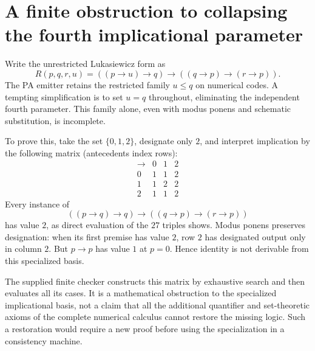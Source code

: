 \section{A finite obstruction to collapsing the fourth implicational parameter}

Write the unrestricted Lukasiewicz form as
\[
 R(p,q,r,u)=((p\to u)\to q)\to((q\to p)\to(r\to p)).
\]
The PA emitter retains the restricted family $u\le q$ on numerical codes.
A tempting simplification is to set $u=q$ throughout, eliminating the
independent fourth parameter. This family alone, even with modus ponens
and schematic substitution, is incomplete.

To prove this, take the set $\{0,1,2\}$, designate only $2$, and interpret
implication by the following matrix (antecedents index rows):
\[
\begin{array}{c|ccc}
\to&0&1&2\\\hline
0&1&1&2\\
1&1&2&2\\
2&1&1&2
\end{array}
\]
Every instance of
\[
 ((p\to q)\to q)\to((q\to p)\to(r\to p))
\]
has value $2$, as direct evaluation of the $27$ triples shows.
Modus ponens preserves designation: when its first premise has value $2$,
row $2$ has designated output only in column $2$. But $p\to p$ has
value $1$ at $p=0$. Hence identity is not derivable from this specialized
basis.

The supplied finite checker constructs this matrix by exhaustive search
and then evaluates all its cases. It is a mathematical obstruction to the
specialized implicational basis, not a claim that all the additional
quantifier and set-theoretic axioms of the complete numerical calculus
cannot restore the missing logic. Such a restoration would require a new
proof before using the specialization in a consistency machine.
